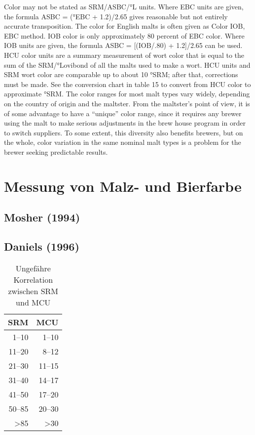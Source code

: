 \documentclass[a4paper,parskip=half]{scrartcl}
\begin{document}
\parencite[11]{Noonan1996}
Color may not be stated as SRM/ASBC/°L units.
Where EBC units are given, the formula ASBC = (°EBC
+ 1.2)/2.65 gives reasonable but not entirely accurate
transposition. The color for English malts is often given as
Color IOB, EBC method. IOB color is only approximately
80 percent of EBC color. Where IOB units are given, the
formula ASBC = [(IOB/.80) + 1.2]/2.65 can be used.
HCU color units are a summary measurement of
wort color that is equal to the sum of the SRM/°Lovibond
of all the malts used to make a wort. HCU units and SRM
wort color are comparable up to about 10 °SRM; after that,
corrections must be made. See the conversion chart in
table 15 to convert from HCU color to approximate °SRM.
The color ranges for most malt types vary widely,
depending on the country of origin and the maltster. From
the maltster’s point of view, it is of some advantage to
have a “unique” color range, since it requires any brewer
using the malt to make serious adjustments in the brew
house program in order to switch suppliers. To some
extent, this diversity also benefits brewers, but on the
whole, color variation in the same nominal malt types is a
problem for the brewer seeking predictable results.

\section*{Messung von Malz- und Bierfarbe}





\subsection*{Mosher (1994)}

\parencite{Mosher1994}

\subsection*{Daniels (1996)}

\parencite{Daniels1996}

\begin{table}[H]
\centering
\begin{tabular}{rr}
\toprule
\multicolumn{1}{c}{\textbf{SRM}} & \multicolumn{1}{c}{\textbf{MCU}} \\
\midrule
1–10 & 1–10 \\
11–20 & 8–12 \\
21–30 & 11–15 \\
31–40 & 14–17 \\
41–50 & 17–20 \\
50–85 & 20–30 \\
>85 & >30 \\
\bottomrule
\end{tabular}
\caption{Ungefähre Korrelation zwischen SRM und MCU \parencite[61]{Daniels1996}}
\label{table:danielsmcu}
\end{table}
\end{document}
